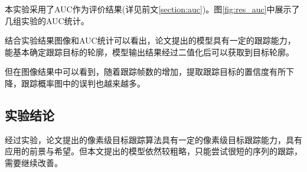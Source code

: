 \par
本实验采用了AUC作为评价结果(详见前文\ref{section:auc})。图\ref{fig:res_auc}中展示了几组实验的AUC统计。
\par
结合实验结果图像和AUC统计可以看出，论文提出的模型具有一定的跟踪能力，能基本确定跟踪目标的轮廓，模型输出结果经过二值化后可以获取到目标轮廓。
\par
但在图像结果中可以看到，随着跟踪帧数的增加，提取跟踪目标的置信度有所下降，跟踪概率图中的误判也越来越多。

\subsection{实验结论}
经过实验，论文提出的像素级目标跟踪算法具有一定的像素级目标跟踪能力，具有应用的前景与希望。但本文提出的模型依然较粗略，只能尝试很短的序列的跟踪，需要继续改善。
